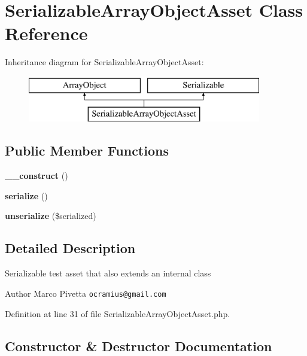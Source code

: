 \section{Serializable\+Array\+Object\+Asset Class Reference}
\label{class_doctrine_test_1_1_instantiator_test_asset_1_1_serializable_array_object_asset}
Inheritance diagram for Serializable\+Array\+Object\+Asset\+:\begin{figure}[H]
\begin{center}
\leavevmode
\includegraphics[height=2.000000cm]{class_doctrine_test_1_1_instantiator_test_asset_1_1_serializable_array_object_asset}
\end{center}
\end{figure}
\subsection*{Public Member Functions}
\begin{DoxyCompactItemize}
\item 
{\bf \+\_\+\+\_\+construct} ()
\item 
{\bf serialize} ()
\item 
{\bf unserialize} (\$serialized)
\end{DoxyCompactItemize}


\subsection{Detailed Description}
Serializable test asset that also extends an internal class

\begin{DoxyAuthor}{Author}
Marco Pivetta {\tt ocramius@gmail.\+com} 
\end{DoxyAuthor}


Definition at line 31 of file Serializable\+Array\+Object\+Asset.\+php.



\subsection{Constructor \& Destructor Documentation}
